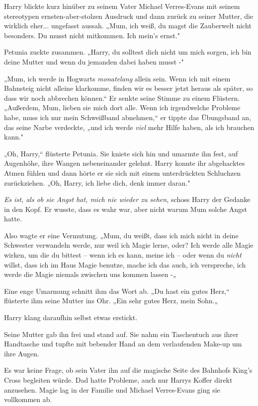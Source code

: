 {Harry blickte kurz hinüber zu seinem Vater Michael Verres-Evans mit seinem stereotypen ernsten-aber-stolzen Ausdruck und dann zurück zu seiner Mutter, die wirklich eher... ungefasst aussah. „Mum, ich weiß, du magst die Zauberwelt nicht besonders. Du musst nicht mitkommen. Ich mein's ernst."

Petunia zuckte zusammen. „Harry, du solltest dich nicht um mich sorgen, ich bin deine Mutter und wenn du jemanden dabei haben musst -"

„Mum, ich werde in Hogwarts \emph{monatelang} allein sein. Wenn ich mit einem Bahnsteig nicht alleine klarkomme, finden wir es besser jetzt heraus als später, so dass wir noch abbrechen können.“ Er senkte seine Stimme zu einem Flüstern. „Außerdem, Mum, lieben sie mich dort alle. Wenn ich irgendwelche Probleme habe, muss ich nur mein Schweißband abnehmen,“ er tippte das Übungsband an, das seine Narbe verdeckte, „und ich werde \emph{viel} mehr Hilfe haben, als ich brauchen kann."

„Oh, Harry,“ flüsterte Petunia. Sie kniete sich hin und umarmte ihn fest, auf Augenhöhe, ihre Wangen nebeneinander gelehnt. Harry konnte ihr abgehacktes Atmen fühlen und dann hörte er sie sich mit einem unterdrückten Schluchzen zurückziehen. „Oh, Harry, ich liebe dich, denk immer daran."

\emph{Es ist, als ob sie Angst hat, mich nie wieder zu sehen,} schoss Harry der Gedanke in den Kopf. Er wusste, dass es wahr war, aber nicht warum Mum solche Angst hatte.

Also wagte er eine Vermutung. „Mum, du weißt, dass ich mich nicht in deine Schwester verwandeln werde, nur weil ich Magie lerne, oder? Ich werde alle Magie wirken, um die du bittest -- wenn ich es kann, meine ich -- oder wenn du \emph{nicht} willst, dass ich im Haus Magie benutze, mache ich das auch, ich verspreche, ich werde die Magie niemals zwischen uns kommen lassen -„

Eine enge Umarmung schnitt ihm das Wort ab. „Du hast ein gutes Herz,“ flüsterte ihm seine Mutter ins Ohr. „Ein sehr gutes Herz, mein Sohn.„

Harry klang daraufhin selbst etwas erstickt.

Seine Mutter gab ihn frei und stand auf. Sie nahm ein Taschentuch aus ihrer Handtasche und tupfte mit bebender Hand an dem verlaufenden Make-up um ihre Augen.

Es war keine Frage, ob sein Vater ihn auf die magische Seite des Bahnhofs King's Cross begleiten würde. Dad hatte Probleme, auch nur Harrys Koffer direkt anzusehen. Magie lag in der Familie und Michael Verres-Evans ging sie vollkommen ab.

}
